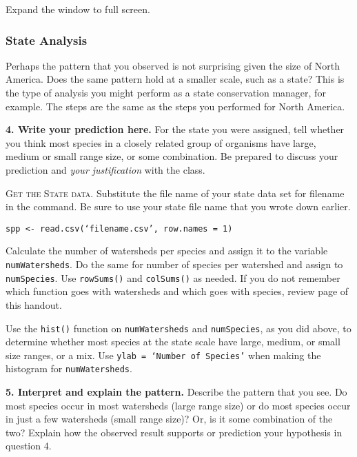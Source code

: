 \documentclass[11pt]{article}
\begin{document}
Expand the window to full screen. 

\subsubsection*{State Analysis}

Perhaps the pattern that you observed is not surprising given the size
of North America. Does the same pattern hold at a smaller scale, such as a state?
This is the type of analysis you might perform as a state conservation
manager, for example. The steps are the same as the steps you
performed for North America.

\textbf{4. Write your prediction here.} For the state you were assigned, 
tell whether you think most species in a closely related
group of organisms have large, medium or small range size, or some
combination. Be prepared to discuss your prediction and \emph{your
justification} with the class.

\vspace{7\baselineskip}

\textsc{Get the State data.} Substitute the file name of your state data set for filename in
the command. Be sure to use your state file name that you wrote down
earlier.


\texttt{spp \textless{}-
read.csv(‘filename.csv’, row.names = 1)}

Calculate the number of watersheds per species and assign it to the
variable \texttt{numWatersheds}. Do the same for number of species per
watershed and assign to \texttt{numSpecies}. Use \texttt{rowSums()} and
\texttt{colSums()} as needed. If you do not remember which function goes
with watersheds and which goes with species, review page \pageref{tab:colrowsums} of this handout.

Use the \texttt{hist()} function on \texttt{numWatersheds} and \texttt{numSpecies}, as you did above,
to determine whether most species at the state scale have large, medium, or
small size ranges, or a mix.  Use \texttt{ylab = ‘Number of Species’} when making the histogram
for \texttt{numWatersheds}. 

\textbf{5. Interpret and explain the pattern.} Describe the pattern that you see. Do most
species occur in most watersheds (large range size) or do most species
occur in just a few watersheds (small range size)? Or, is it some
combination of the two? Explain how the observed result supports or
prediction your hypothesis in question 4.
\end{document}
